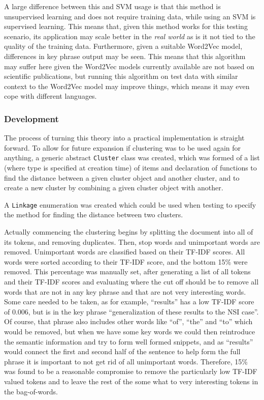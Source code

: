 A large difference between this and SVM usage is that this method is unsupervised learning and does not require training data, while using an SVM is supervised learning. This means that, given this method works for this testing scenario, its application may scale better in the \textit{real world} as is it not tied to the quality of the training data. Furthermore, given a suitable Word2Vec model, differences in key phrase output may be seen. This means that this algorithm may suffer here given the Word2Vec models currently available are not based on scientific publications, but running this algorithm on test data with similar context to the Word2Vec model may improve things, which means it may even cope with different languages.

\subsubsection*{Development}
The process of turning this theory into a practical implementation is straight forward. To allow for future expansion if clustering was to be used again for anything, a generic abstract \texttt{Cluster} class was created, which was formed of a list (where type is specified at creation time) of items and declaration of functions to find the distance between a given cluster object and another cluster, and to create a new cluster by combining a given cluster object with another.

A \texttt{Linkage} enumeration was created which could be used when testing to specify the method for finding the distance between two clusters.

Actually commencing the clustering begins by splitting the document into all of its tokens, and removing duplicates. Then, stop words and unimportant words are removed. Unimportant words are classified based on their TF-IDF scores. All words were sorted according to their TF-IDF score, and the bottom 15\% were removed. This percentage was manually set, after generating a list of all tokens and their TF-IDF scores and evaluating where the cut off should be to remove all words that are not in any key phrase and that are not very interesting words. Some care needed to be taken, as for example, ``results'' has a low TF-IDF score of 0.006, but is in the key phrase ``generalization of these results to the NSI case''. Of course, that phrase also includes other words like ``of'', ``the'' and ``to'' which would be removed, but when we have some key words we could then reintroduce the semantic information and try to form well formed snippets, and as ``results'' would connect the first and second half of the sentence to help form the full phrase it is important to not get rid of all unimportant words. Therefore, 15\% was found to be a reasonable compromise to remove the particularly low TF-IDF valued tokens and to leave the rest of the some what to very interesting tokens in the bag-of-words.


